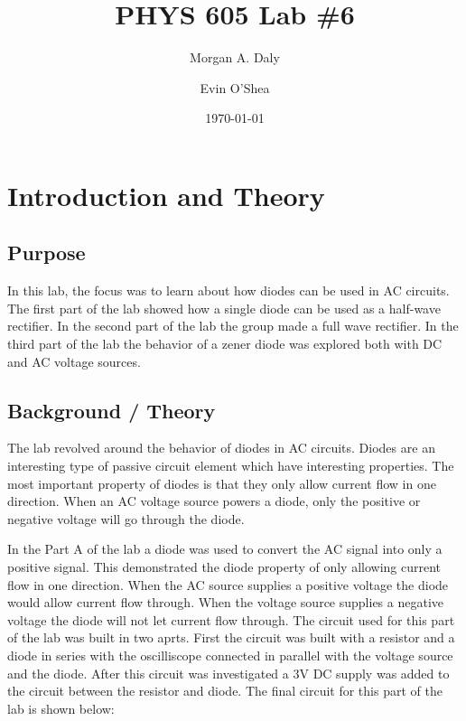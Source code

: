 \documentclass[twocolumn, amsmath]{revtex4}
\begin{document}
\title{PHYS 605 Lab \#6} 

\author{Morgan A. Daly}
\author{Evin O'Shea}
\date{\today} 


\maketitle


\section{Introduction and Theory}
\subsection{Purpose}

In this lab, the focus was to learn about how diodes can be used in AC circuits. The first part of the lab showed how a single diode can be used as a half-wave rectifier. In the second part of the lab the group made a full wave rectifier. In the third part of the lab the behavior of a zener diode was explored both with DC and AC voltage sources.

\subsection{Background / Theory}

The lab revolved around the behavior of diodes in AC circuits. Diodes are an interesting type of passive circuit element which have interesting properties. The most important property of diodes is that they only allow current flow in one direction. When an AC voltage source powers a diode, only the positive or negative voltage will go through the diode. 

In the Part A of the lab a diode was used to convert the AC signal into only a positive signal. This demonstrated the diode property of only allowing current flow in one direction. When the AC source supplies a positive voltage the diode would allow current flow through. When the voltage source supplies a negative voltage the diode will not let current flow through. The circuit used for this part of the lab was built in two aprts. First the circuit was built with a resistor and a diode in series with the oscilliscope connected in parallel with the voltage source and the diode. After this circuit was investigated a 3V DC supply was added to the circuit between the resistor and diode. The final circuit for this part of the lab is shown below:
\end{document}
